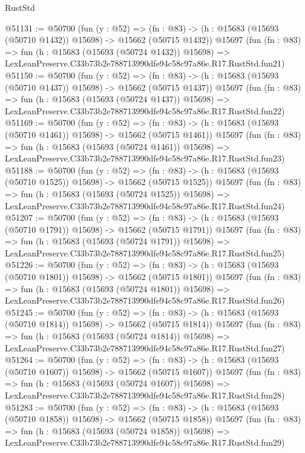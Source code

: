 \begin{lexlean}{RustStd}
\begin{coremodule}
@51131 := @50700
    (fun (y : @52) =>
    (fn : @83) -> (h : @15683 (@15693 (@50710 @1432)) @15698) -> @15662 (@50715 @1432))
    @15697
    (fun (fn : @83) =>
    fun (h : @15683 (@15693 (@50724 @1432)) @15698) =>
    LexLeanPreserve.C33b73b2e788713990dfe94c58c97a86e.R17.RustStd.fun21)
@51150 := @50700
    (fun (y : @52) =>
    (fn : @83) -> (h : @15683 (@15693 (@50710 @1437)) @15698) -> @15662 (@50715 @1437))
    @15697
    (fun (fn : @83) =>
    fun (h : @15683 (@15693 (@50724 @1437)) @15698) =>
    LexLeanPreserve.C33b73b2e788713990dfe94c58c97a86e.R17.RustStd.fun22)
@51169 := @50700
    (fun (y : @52) =>
    (fn : @83) -> (h : @15683 (@15693 (@50710 @1461)) @15698) -> @15662 (@50715 @1461))
    @15697
    (fun (fn : @83) =>
    fun (h : @15683 (@15693 (@50724 @1461)) @15698) =>
    LexLeanPreserve.C33b73b2e788713990dfe94c58c97a86e.R17.RustStd.fun23)
@51188 := @50700
    (fun (y : @52) =>
    (fn : @83) -> (h : @15683 (@15693 (@50710 @1525)) @15698) -> @15662 (@50715 @1525))
    @15697
    (fun (fn : @83) =>
    fun (h : @15683 (@15693 (@50724 @1525)) @15698) =>
    LexLeanPreserve.C33b73b2e788713990dfe94c58c97a86e.R17.RustStd.fun24)
@51207 := @50700
    (fun (y : @52) =>
    (fn : @83) -> (h : @15683 (@15693 (@50710 @1791)) @15698) -> @15662 (@50715 @1791))
    @15697
    (fun (fn : @83) =>
    fun (h : @15683 (@15693 (@50724 @1791)) @15698) =>
    LexLeanPreserve.C33b73b2e788713990dfe94c58c97a86e.R17.RustStd.fun25)
@51226 := @50700
    (fun (y : @52) =>
    (fn : @83) -> (h : @15683 (@15693 (@50710 @1801)) @15698) -> @15662 (@50715 @1801))
    @15697
    (fun (fn : @83) =>
    fun (h : @15683 (@15693 (@50724 @1801)) @15698) =>
    LexLeanPreserve.C33b73b2e788713990dfe94c58c97a86e.R17.RustStd.fun26)
@51245 := @50700
    (fun (y : @52) =>
    (fn : @83) -> (h : @15683 (@15693 (@50710 @1814)) @15698) -> @15662 (@50715 @1814))
    @15697
    (fun (fn : @83) =>
    fun (h : @15683 (@15693 (@50724 @1814)) @15698) =>
    LexLeanPreserve.C33b73b2e788713990dfe94c58c97a86e.R17.RustStd.fun27)
@51264 := @50700
    (fun (y : @52) =>
    (fn : @83) -> (h : @15683 (@15693 (@50710 @1607)) @15698) -> @15662 (@50715 @1607))
    @15697
    (fun (fn : @83) =>
    fun (h : @15683 (@15693 (@50724 @1607)) @15698) =>
    LexLeanPreserve.C33b73b2e788713990dfe94c58c97a86e.R17.RustStd.fun28)
@51283 := @50700
    (fun (y : @52) =>
    (fn : @83) -> (h : @15683 (@15693 (@50710 @1858)) @15698) -> @15662 (@50715 @1858))
    @15697
    (fun (fn : @83) =>
    fun (h : @15683 (@15693 (@50724 @1858)) @15698) =>
    LexLeanPreserve.C33b73b2e788713990dfe94c58c97a86e.R17.RustStd.fun29)

\end{coremodule}
\end{lexlean}
